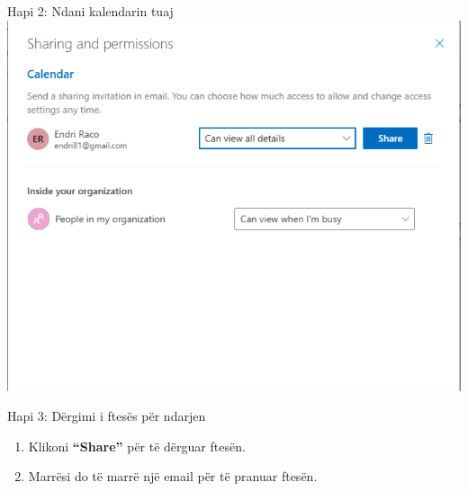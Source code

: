 \documentclass[
  ignorenonframetext,
]{beamer}
\begin{document}
\begin{frame}{Hapi 2: Ndani kalendarin tuaj}
\label{hapi-2-ndani-kalendarin-tuaj-3}
\includegraphics{./images/outlook29.png}
\end{frame}

\begin{frame}{Hapi 3: Dërgimi i ftesës për ndarjen}
\label{hapi-3-duxebrgimi-i-ftesuxebs-puxebr-ndarjen}
\begin{enumerate}
\item
  Klikoni \textbf{``Share''} për të dërguar ftesën.
\item
  Marrësi do të marrë një email për të pranuar ftesën.
\end{enumerate}
\end{frame}
\end{document}
